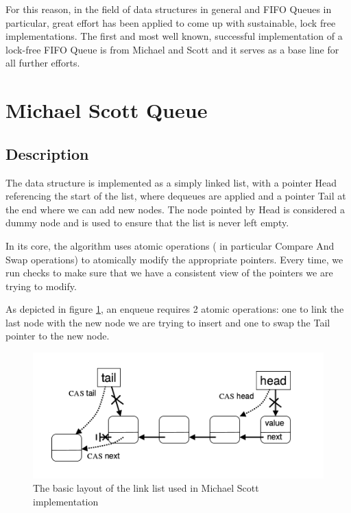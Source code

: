 
For this reason, in the field of data structures in general and FIFO Queues in particular, great effort has been applied to come up with sustainable, lock free implementations. The first and most well known, successful implementation of a lock-free FIFO Queue is from Michael and Scott \cite{msqueue} and it serves as a base line for all further efforts.

\section{Michael Scott Queue}
\subsection{Description}

The data structure is implemented as a simply linked list, with a pointer Head referencing the start of the list, where dequeues are applied and a pointer Tail at the end where we can add new nodes. The node pointed by Head is considered a dummy node  and is used to ensure that the list is never left empty.

In its core, the algorithm uses atomic operations ( in particular Compare And Swap operations) to atomically modify the appropriate pointers. Every time, we run checks to make sure that we have a consistent view of the pointers we are trying to modify.

As depicted in figure \ref{ms_queue_struct}, an enqueue requires 2 atomic operations: one to link the last node with the new node we are trying to insert and one to swap the Tail pointer to the new node.

\begin{figure}
 \centering
  \includegraphics[scale=0.4]{msqueue_struct.png}
\caption{ The basic layout of the link list used in Michael Scott implementation}
\label{ms_queue_struct}
\end{figure}

